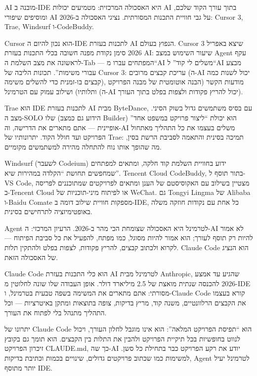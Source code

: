 AI מובנה ב-IDE היא האסכולה המרכזית: מטמיעים יכולות AI בתוך עורך הקוד שלכם, ומוסיפים שיפורי AI על גבי חוויית התכנות המסורתית. נציגי האסכולה ב-2026: Cursor 3, Trae, Windsurf ו-CodeBuddy.


Cursor הוא נכון להיום ה-IDE לתכנות בעזרת AI הנפוץ בעולם. Cursor 3 שיצא באפריל 2026 סימן נקודת מפנה חשובה בכלי התכנות בעזרת AI: שיעור השימוש במצב Agent עקף לראשונה את מצב השלמת ה-Tab — המפתחים עברו מ“AI משלים לי קוד” ל“AI מבצע עבורי משימות”. תכונות הליבה של Cursor 3: עריכת קבצים מרובים (ה-AI יכול לשנות כמה קבצים בו-זמנית כדי להשלים משימה), מודעות הקשר (הבנה אוטומטית של מבנה הפרויקט ותלותיו) ושילוב עמוק עם הטרמינל (ה-AI יכול להריץ פקודות ולצפות בפלט בתוך העורך).


Trae הוא IDE לתכנות בעזרת AI מבית ByteDance, עם בסיס משתמשים גדול בשוק הסיני. מצב ה-SOLO שלו (הידוע גם כמצב Builder) הוא יכולת “ליצור פרויקט במשפט אחד” אופיינית — אתם מתארים את הדרישה, וה-AI משלים בעצמו את כל התהליך מאתחול הפרויקט ועד חולל הקוד. יתרונותיו של Trae: תמיכה בסינית והתאמה לסביבת הרשת בסין, מה שהופך אותו נוח להתחלה מהירה למשתמשים מקומיים.


Windsurf (לשעבר Codeium) ידוע בחוויית השלמת קוד חלקה, ומתאים למפתחים שמחפשים תחושת “הקלדה במהירות שיא”. Tencent Cloud CodeBuddy, בתור תוסף ל-VS Code, מצטיין בשילוב עם האקוסיסטם של הענן ומתאים לפרויקטים שמתוכננים לפריסה ב-Tencent Cloud או לפיתוח מיני-תוכניות של WeChat. גם Tongyi Lingma של Alibaba ו-Baidu Comate מספקות חוויית שילוב דומה ב-IDE, כל אחת עם נקודות חוזקה משלה באופטימיזציה לתרחישים בסינית.


Agent לטרמינל היא האסכולה שצומחת הכי מהר ב-2026. הרעיון המרכזי: ה-AI לא אמור להיות רק תוסף לעורך; הוא אמור להיות מסוגל, כמו מפתח, להפעיל את כל סביבת הפיתוח — לקרוא ולכתוב קבצים, להריץ פקודות, לצפות בפלט ולהתקין תלות. Claude Code הוא הנציג של האסכולה הזאת.


Claude Code הוא כלי התכנות בעזרת AI לטרמינל מבית Anthropic, שהגיע עד אמצע 2026 להכנסה שנתית מואצת של 2.5 מיליארד דולר. אופן העבודה שלו שונה לחלוטין מ-IDE מסורתי: אתם מתארים את המשימה בשפה טבעית בטרמינל, ו-Claude Code קורא בעצמו את הקבצים הרלוונטיים, משנה קוד, מריץ בדיקות, צופה בתוצאות ומתקן באיטרציות — וכל התהליך מתנהל בלי לפתוח את העורך.

יתרונו של Claude Code הוא “תפיסת הפרויקט המלאה”: הוא אינו מוגבל לחלון העורך, ויכול לנווט בחופשיות בכל תיקיית הפרויקט ולהבין את התלות בין הקבצים. הוא תומך גם בקובץ זיכרון הפרויקט CLAUDE.md, כך שה-AI יודע את רקע הפרויקט כבר בתחילת כל סשן. למשימות כמו שכתוב פרויקטים גדולים, שינויים בכמות וכתיבת בדיקות, Agent לטרמינל יעיל יותר מתוסף IDE.

